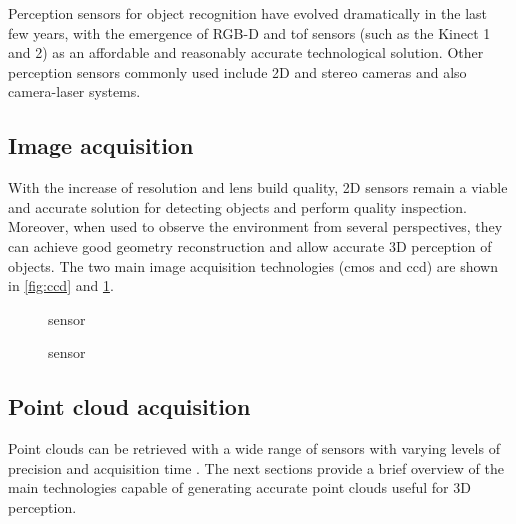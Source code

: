 Perception sensors for object recognition have evolved dramatically in the last few years, with the emergence of RGB-D and \gls{tof} sensors (such as the Kinect 1 and 2) as an affordable and reasonably accurate technological solution. Other perception sensors commonly used include 2D and stereo cameras and also camera-laser systems.


\subsection{Image acquisition}\label{sec:image-acquisition}

With the increase of resolution and lens build quality, 2D sensors remain a viable and accurate solution for detecting objects and perform quality inspection. Moreover, when used to observe the environment from several perspectives, they can achieve good geometry reconstruction and allow accurate 3D perception of objects. The two main image acquisition technologies (\gls{cmos} and \gls{ccd}) are shown in \cref{fig:ccd} and \cref{fig:cmos}.


\begin{figure}[H]
	\begin{floatrow}[2]
		{\caption[ sensor]{ sensor\protect\footnotemark}\label{fig:ccd}}

		{\caption[ sensor]{ sensor\protect\footnotemark}\label{fig:cmos}}
	\end{floatrow}
\end{figure}


\subsection{Point cloud acquisition}\label{sec:point-cloud-acquisition}

Point clouds can be retrieved with a wide range of sensors with varying levels of precision and acquisition time \cite{Sansoni2009}. The next sections provide a brief overview of the main technologies capable of generating accurate point clouds useful for 3D perception.


